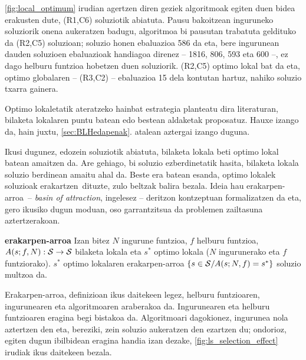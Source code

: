 \documentclass[eu]{ifirak}\usepackage[]{graphicx}\usepackage[]{color}
\newcommand{\zkk}{\guillemotleft}
\newcommand{\skk}{\guillemotright}
\begin{document}
\begin{tcolorbox}
\begin{ifexample}
\ref{fig:local_optimum} irudian agertzen diren geziek algoritmoak egiten duen bidea erakusten dute, (R1,C6) soluziotik abiatuta. Pausu bakoitzean inguruneko soluziorik onena aukeratzen badugu, algoritmoa bi pausutan trabatuta geldituko da (R2,C5) soluzioan; soluzio honen ebaluazioa 586 da eta, bere ingurunean dauden soluzioen ebaluazioak handiagoa direnez -- 1816, 806, 593 eta 600 --, ez dago helburu funtzioa hobetzen duen soluziorik. (R2,C5) optimo lokal bat da eta, optimo globalaren -- (R3,C2) -- ebaluazioa 15 dela kontutan hartuz, nahiko soluzio txarra gainera.
\end{ifexample}
\end{tcolorbox}

Optimo lokaletatik ateratzeko hainbat estrategia planteatu dira literaturan, bilaketa lokalaren puntu batean edo bestean aldaketak proposatuz. Hauxe izango da, hain juxtu, \ref{sec:BLHedapenak}. atalean aztergai izango duguna.

Ikusi dugunez, edozein soluziotik abiatuta, bilaketa lokala beti optimo lokal batean amaitzen da. Are gehiago, bi soluzio ezberdinetatik hasita, bilaketa lokala soluzio berdinean amaitu ahal da. Beste era batean esanda, optimo lokalek soluzioak \zkk erakartzen\skk\ dituzte, zulo beltzak balira bezala. Ideia hau \zkk erakarpen-arroa\skk\ -- \textit{basin of attraction}, ingelesez -- deritzon kontzeptuan formalizatzen da eta, gero ikusiko dugun moduan, oso garrantzitsua da problemen zailtasuna aztertzerakoan.

\begin{ifdefinition}{\bf erakarpen-arroa}
Izan bitez $N$ ingurune funtzioa, $f$ helburu funtzioa, $A(s;f,N): {\cal S}\rightarrow {\cal S}$ bilaketa lokala eta $s^*$ optimo lokala ($N$ ingurunerako eta $f$ funtziorako). $s^*$ optimo lokalaren erakarpen-arroa $\{s \in {\cal S} / A(s;N,f)=s^*\}$ soluzio multzoa da.
\end{ifdefinition} 

Erakarpen-arroa, definizioan ikus daitekeen legez, helburu funtzioaren, ingurunearen eta algoritmoaren araberakoa da. Ingurunearen eta helburu funtzioaren eragina begi bistakoa da. Algoritmoari dagokionez, ingurunea nola aztertzen den eta, bereziki, zein soluzio aukeratzen den ezartzen du; ondorioz, egiten dugun ibilbidean eragina handia izan dezake, \ref{fig:ls_selection_effect} irudiak ikus daitekeen bezala.
\end{document}
